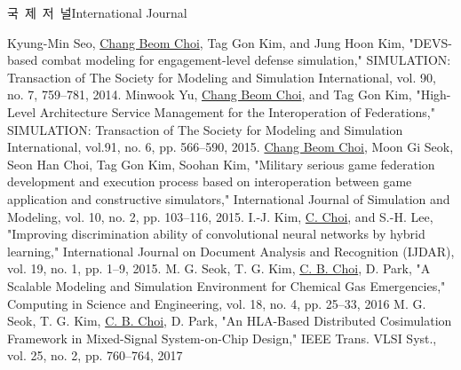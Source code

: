 \documentclass[english,full]{resume_structure}
\begin{document}
\begin{Publication} %

{국\ 제\ 저\ 널}{International Journal}
{}{} 
{
\begin{itemize}
   {Kyung-Min Seo, \underline{Chang Beom Choi}, Tag Gon Kim, and Jung Hoon Kim, "DEVS-based combat modeling for engagement-level defense simulation," SIMULATION: Transaction of The Society for Modeling and Simulation International, vol. 90, no. 7, 759--781, 2014.}
   {Minwook Yu, \underline{Chang Beom Choi}, and Tag Gon Kim, "High-Level Architecture Service Management for the Interoperation of Federations," SIMULATION: Transaction of The Society for Modeling and Simulation International, vol.91, no. 6, pp. 566--590, 2015.}
   {\underline{Chang Beom Choi}, Moon Gi Seok, Seon Han Choi, Tag Gon Kim, Soohan Kim, "Military serious game federation development and execution process based on interoperation between game application and constructive simulators," International Journal of Simulation and Modeling, vol. 10, no. 2, pp. 103--116, 2015.}
   {I.-J. Kim, \underline{C. Choi}, and S.-H. Lee, "Improving discrimination ability of convolutional neural networks by hybrid learning," International Journal on Document Analysis and Recognition (IJDAR), vol. 19, no. 1, pp. 1--9, 2015.}
   {
  M. G. Seok, T. G. Kim, \underline{C. B. Choi}, D. Park, "A Scalable Modeling and Simulation Environment for Chemical Gas Emergencies," Computing in Science and Engineering, vol. 18, no. 4, pp. 25--33, 2016}
   {
  M. G. Seok, T. G. Kim, \underline{C. B. Choi}, D. Park, "An HLA-Based Distributed Cosimulation Framework in Mixed-Signal System-on-Chip Design," IEEE Trans. VLSI Syst., vol. 25, no. 2, pp. 760--764, 2017}
\end{itemize}
}


\end{Publication}
\end{document}
